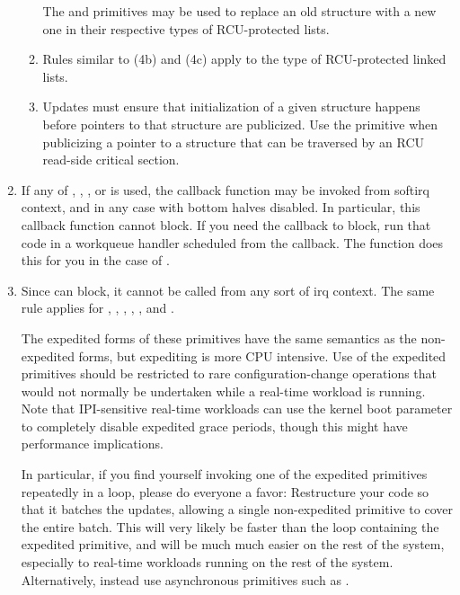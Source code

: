 \begin{enumerate}[start=0]
\begin{enumerate}
		The  and  primitives
		may be used to replace an old structure with a new one
		in their respective types of RCU-protected lists.

	\item	Rules similar to (4b) and (4c) apply to the 
		type of RCU-protected linked lists.

	\item	Updates must ensure that initialization of a given
		structure happens before pointers to that structure are
		publicized.
		Use the  primitive
		when publicizing a pointer to a structure that can
		be traversed by an RCU read-side critical section.
	\end{enumerate}

\item	If any of , , , or
	 is used, the callback function may be
	invoked from softirq context, and in any case with bottom halves
	disabled.  In particular, this callback function cannot block.
	If you need the callback to block, run that code in a workqueue
	handler scheduled from the callback.
	The 
	function does this for you in the case of .

\item	Since  can block, it cannot be called
	from any sort of irq context.
	The same rule applies
	for , ,
	, ,
	, and .

	The expedited forms of these primitives have the same semantics
	as the non-expedited forms, but expediting is more CPU intensive.
	Use of the expedited primitives should be restricted to rare
	configuration-change operations that would not normally be
	undertaken while a real-time workload is running.
	Note that
	IPI-sensitive real-time workloads can use the 
	kernel boot parameter to completely disable expedited grace
	periods, though this might have performance implications.

	In particular, if you find yourself invoking one of the expedited
	primitives repeatedly in a loop, please do everyone a favor:
	Restructure your code so that it batches the updates, allowing
	a single non-expedited primitive to cover the entire batch.
	This will very likely be faster than the loop containing the
	expedited primitive, and will be much much easier on the rest
	of the system, especially to real-time workloads running on the
	rest of the system.
	Alternatively, instead use asynchronous
	primitives such as .


\end{enumerate}
